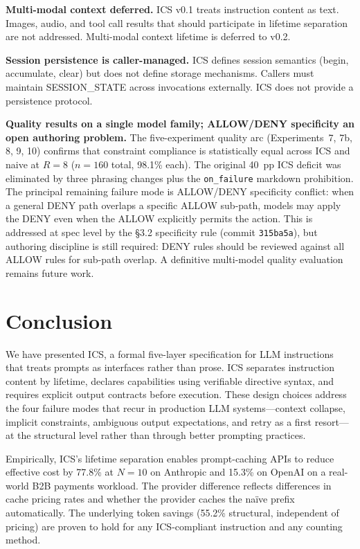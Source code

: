\documentclass[11pt]{article}
\begin{document}
\textbf{Multi-modal context deferred.} ICS v0.1 treats instruction content as
text. Images, audio, and tool call results that should participate in lifetime
separation are not addressed. Multi-modal context lifetime is deferred to
v0.2.

\textbf{Session persistence is caller-managed.} ICS defines session semantics
(begin, accumulate, clear) but does not define storage mechanisms. Callers
must maintain SESSION\_STATE across invocations externally. ICS does not
provide a persistence protocol.

\textbf{Quality results on a single model family; ALLOW/DENY specificity an open authoring problem.}
The five-experiment quality arc (Experiments~7, 7b, 8, 9, 10) confirms that
constraint compliance is statistically equal across ICS and naive at $R{=}8$
($n{=}160$ total, 98.1\% each). The original 40~pp ICS deficit was eliminated
by three phrasing changes plus the \texttt{on\_failure} markdown prohibition.
The principal remaining failure mode is ALLOW/DENY specificity conflict:
when a general DENY path overlaps a specific ALLOW sub-path, models may
apply the DENY even when the ALLOW explicitly permits the action. This is
addressed at spec level by the §3.2 specificity rule (commit
\texttt{315ba5a}), but authoring discipline is still required: DENY rules
should be reviewed against all ALLOW rules for sub-path overlap. A
definitive multi-model quality evaluation remains future work.

\section{Conclusion}
\label{sec:conclusion}

We have presented ICS, a formal five-layer specification for LLM instructions
that treats prompts as interfaces rather than prose. ICS separates instruction
content by lifetime, declares capabilities using verifiable directive syntax,
and requires explicit output contracts before execution. These design choices
address the four failure modes that recur in production LLM systems---context
collapse, implicit constraints, ambiguous output expectations, and retry as
a first resort---at the structural level rather than through better prompting
practices.

Empirically, ICS's lifetime separation enables prompt-caching APIs to reduce
effective cost by 77.8\% at $N{=}10$ on Anthropic and 15.3\% on OpenAI on a
real-world B2B payments workload. The provider difference reflects differences
in cache pricing rates and whether the provider caches the na\"{i}ve prefix
automatically. The underlying token savings (55.2\% structural, independent of
pricing) are proven to hold for any ICS-compliant instruction and any counting
method.
\end{document}

